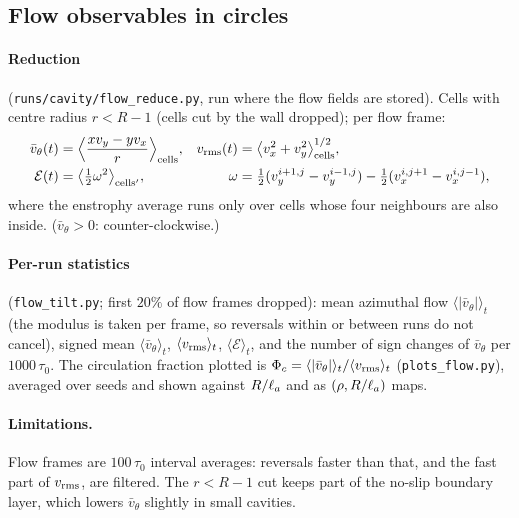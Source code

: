\subsection{Flow observables in circles}
\label{sec:md-flow}

\paragraph{Reduction} (\texttt{runs/cavity/flow\_reduce.py}, run where the flow fields are stored). Cells with centre radius
$r<R-1$ (cells cut by the wall dropped); per flow frame:
\begin{align}
  \bar v_\theta(t)&=\Big\langle\frac{x v_y-y v_x}{r}\Big\rangle_{\rm cells},&
  v_{\rm rms}(t)&=\big\langle v_x^2+v_y^2\big\rangle_{\rm cells}^{1/2},\\
  \mathcal E(t)&=\big\langle\tfrac12\omega^2\big\rangle_{\rm cells'},&
  \omega&=\tfrac12(v_y^{i+1,j}-v_y^{i-1,j})-\tfrac12(v_x^{i,j+1}-v_x^{i,j-1}),
\end{align}
where the enstrophy average runs only over cells whose four neighbours are also inside. ($\bar v_\theta>0$: counter-clockwise.)

\paragraph{Per-run statistics} (\texttt{flow\_tilt.py}; first $20\%$ of flow frames dropped): mean azimuthal flow
$\langle|\bar v_\theta|\rangle_t$ (the modulus is taken per frame, so reversals within or between runs do not cancel), signed mean
$\langle\bar v_\theta\rangle_t$, $\langle v_{\rm rms}\rangle_t$, $\langle\mathcal E\rangle_t$, and the number of sign changes of $\bar v_\theta$
per $1000\,\tau_0$. The circulation fraction plotted is $\Phi_c=\langle|\bar v_\theta|\rangle_t/\langle v_{\rm rms}\rangle_t$
(\texttt{plots\_flow.py}), averaged over seeds and shown against $R/\ell_a$ and as $(\rho,R/\ell_a)$ maps.
\paragraph{Limitations.} Flow frames are $100\,\tau_0$ interval averages: reversals faster than that, and the fast part of $v_{\rm rms}$,
are filtered. The $r<R-1$ cut keeps part of the no-slip boundary layer, which lowers $\bar v_\theta$ slightly in small cavities.

